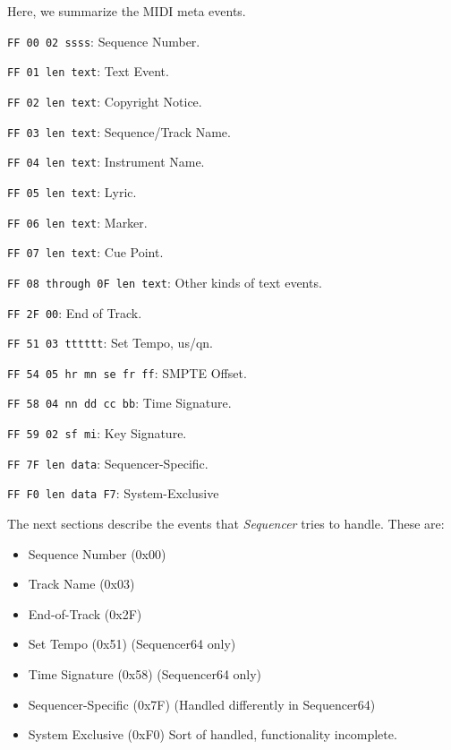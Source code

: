 Here, we summarize the MIDI meta events.

   \begin{enumber}
      \item \texttt{FF 00 02 ssss}: Sequence Number.
      \item \texttt{FF 01 len text}: Text Event.
      \item \texttt{FF 02 len text}: Copyright Notice.
      \item \texttt{FF 03 len text}: Sequence/Track Name.
      \item \texttt{FF 04 len text}: Instrument Name.
      \item \texttt{FF 05 len text}: Lyric.
      \item \texttt{FF 06 len text}: Marker.
      \item \texttt{FF 07 len text}: Cue Point.
      \item \texttt{FF 08 through 0F len text}: Other kinds of  text events.
      \item \texttt{FF 2F 00}: End of Track.
      \item \texttt{FF 51 03 tttttt}: Set Tempo, us/qn.
      \item \texttt{FF 54 05 hr mn se fr ff}: SMPTE Offset.
      \item \texttt{FF 58 04 nn dd cc bb}: Time Signature.
      \item \texttt{FF 59 02 sf mi}: Key Signature.
      \item \texttt{FF 7F len data}: Sequencer-Specific.
      \item \texttt{FF F0 len data F7}: System-Exclusive
   \end{enumber}

The next sections describe the events that \textsl{Sequencer} tries to handle.
These are:

   \begin{itemize}
      \item Sequence Number (0x00)
      \item Track Name (0x03)
      \item End-of-Track (0x2F)
      \item Set Tempo (0x51) (Sequencer64 only)
      \item Time Signature (0x58) (Sequencer64 only)
      \item Sequencer-Specific (0x7F) (Handled differently in Sequencer64)
      \item System Exclusive (0xF0) Sort of handled, functionality incomplete.
   \end{itemize}

